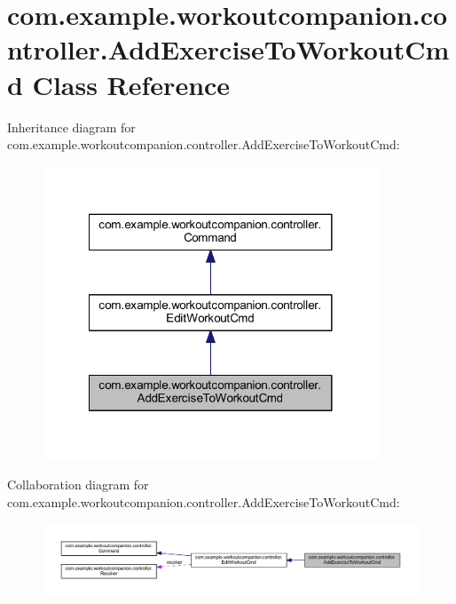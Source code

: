 \hypertarget{classcom_1_1example_1_1workoutcompanion_1_1controller_1_1_add_exercise_to_workout_cmd}{\section{com.\-example.\-workoutcompanion.\-controller.\-Add\-Exercise\-To\-Workout\-Cmd Class Reference}
\label{classcom_1_1example_1_1workoutcompanion_1_1controller_1_1_add_exercise_to_workout_cmd}
}


Inheritance diagram for com.\-example.\-workoutcompanion.\-controller.\-Add\-Exercise\-To\-Workout\-Cmd\-:\nopagebreak
\begin{figure}[H]
\begin{center}
\leavevmode
\includegraphics[width=284pt]{classcom_1_1example_1_1workoutcompanion_1_1controller_1_1_add_exercise_to_workout_cmd__inherit__graph}
\end{center}
\end{figure}


Collaboration diagram for com.\-example.\-workoutcompanion.\-controller.\-Add\-Exercise\-To\-Workout\-Cmd\-:\nopagebreak
\begin{figure}[H]
\begin{center}
\leavevmode
\includegraphics[width=350pt]{classcom_1_1example_1_1workoutcompanion_1_1controller_1_1_add_exercise_to_workout_cmd__coll__graph}
\end{center}
\end{figure}
